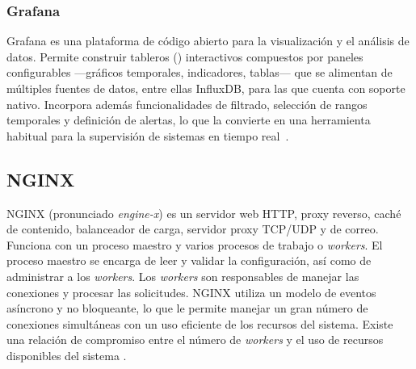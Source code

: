 \subsubsection{Grafana}

Grafana es una plataforma de código abierto para la visualización y el análisis de datos. Permite construir tableros () interactivos compuestos por paneles configurables ---gráficos temporales, indicadores, tablas--- que se alimentan de múltiples fuentes de datos, entre ellas InfluxDB, para las que cuenta con soporte nativo. Incorpora además funcionalidades de filtrado, selección de rangos temporales y definición de alertas, lo que la convierte en una herramienta habitual para la supervisión de sistemas en tiempo real~\cite{grafana}.

\subsection{NGINX}

NGINX (pronunciado \textit{engine-x}) es un servidor web HTTP, proxy reverso, caché de contenido, balanceador de carga, servidor proxy TCP/UDP y de correo. Funciona con un proceso maestro y varios procesos de trabajo o \textit{workers}. El proceso maestro se encarga de leer y validar la configuración, así como de administrar a los \textit{workers}.
Los \textit{workers} son responsables de manejar las conexiones y procesar las solicitudes. NGINX utiliza un modelo de eventos asíncrono y no bloqueante, lo que le permite manejar un gran número de conexiones simultáneas con un uso eficiente de los recursos del sistema. Existe una relación de compromiso entre el número de \textit{workers} y el uso de recursos disponibles del sistema \cite{nginx_beginners_guide}.